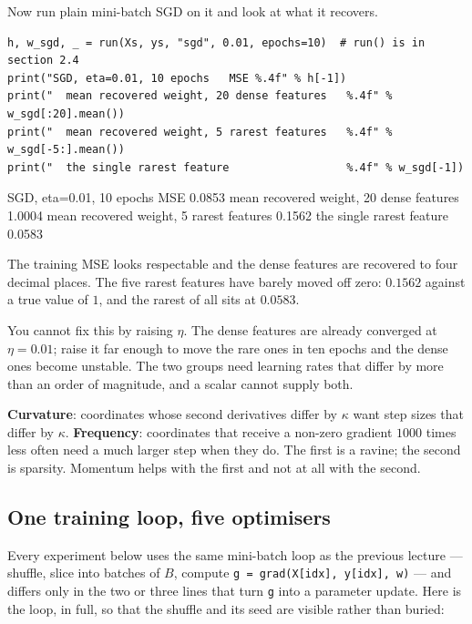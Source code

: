 \documentclass[11pt]{article}
\begin{document}
Now run plain mini-batch SGD on it and look at what it recovers.

\begin{lstlisting}
h, w_sgd, _ = run(Xs, ys, "sgd", 0.01, epochs=10)  # run() is in section 2.4
print("SGD, eta=0.01, 10 epochs   MSE %.4f" % h[-1])
print("  mean recovered weight, 20 dense features   %.4f" % w_sgd[:20].mean())
print("  mean recovered weight, 5 rarest features   %.4f" % w_sgd[-5:].mean())
print("  the single rarest feature                  %.4f" % w_sgd[-1])
\end{lstlisting}
\begin{codeout}
SGD, eta=0.01, 10 epochs   MSE 0.0853
  mean recovered weight, 20 dense features   1.0004
  mean recovered weight, 5 rarest features   0.1562
  the single rarest feature                  0.0583
\end{codeout}

The training MSE looks respectable and the dense features are recovered to four
decimal places. The five rarest features have barely moved off zero: $0.1562$
against a true value of $1$, and the rarest of all sits at $0.0583$.

You cannot fix this by raising $\eta$. The dense features are already converged
at $\eta = 0.01$; raise it far enough to move the rare ones in ten epochs and
the dense ones become unstable. The two groups need learning rates that differ
by more than an order of magnitude, and a scalar cannot supply both.

\begin{keyidea}
\textbf{Curvature}: coordinates whose second derivatives differ by $\kappa$
want step sizes that differ by $\kappa$. \textbf{Frequency}: coordinates that
receive a non-zero gradient $1000$ times less often need a much larger step
when they do. The first is a ravine; the second is sparsity. Momentum helps
with the first and not at all with the second.
\end{keyidea}

\subsection{One training loop, five optimisers}
\label{sec:runloop}

Every experiment below uses the same mini-batch loop as the previous lecture
--- shuffle, slice into batches of $B$, compute \texttt{g = grad(X[idx],
y[idx], w)} --- and differs only in the two or three lines that turn \texttt{g}
into a parameter update. Here is the loop, in full, so that the shuffle and its
seed are visible rather than buried:
\end{document}
